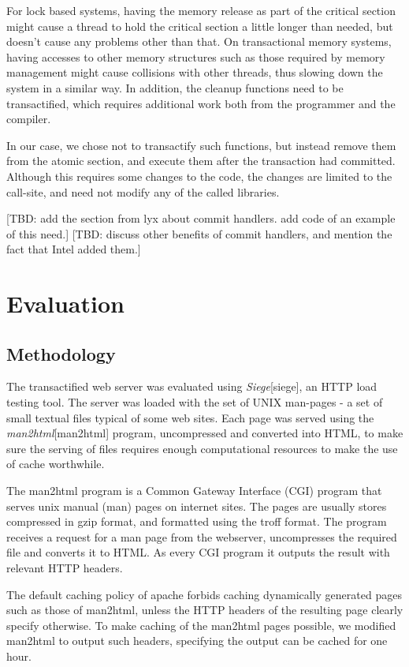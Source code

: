 \documentclass[preprint,natbib,11pt]{sigplanconf}
\begin{document}
For lock based systems, having the memory release as part of the critical section might cause a thread to hold the critical section a little longer than needed, but doesn't cause any problems other than that. On transactional memory systems, having accesses to other memory structures such as those required by memory management might cause collisions with other threads, thus slowing down the system in a similar way. In addition, the cleanup functions need to be transactified, which requires additional work both from the programmer and the compiler.

In our case, we chose not to transactify such functions, but instead remove them from the atomic section, and execute them after the transaction had committed. Although this requires some changes to the code, the changes are limited to the call-site, and need not modify any of the called libraries.

[TBD: add the section from lyx about commit handlers. add code of an example of this need.]
[TBD: discuss other benefits of commit handlers, and mention the fact that Intel added them.]
\section{Evaluation}
\subsection{Methodology}
The transactified web server was evaluated using \emph{Siege}[siege], an HTTP load testing tool. The server was loaded with the set of UNIX man-pages - a set of small textual files typical of some web sites. Each page was served using the \emph{man2html}[man2html] program, uncompressed and converted into HTML, to make sure the serving of files requires enough computational resources to make the use of cache worthwhile.

The man2html program is a Common Gateway Interface (CGI) program that serves unix manual (man) pages on internet sites. The pages are usually stores compressed in gzip format, and formatted using the troff format. The program receives a request for a man page from the webserver, uncompresses the required file and converts it to HTML. As every CGI program it outputs the result with relevant HTTP headers.

The default caching policy of apache forbids caching dynamically generated pages such as those of man2html, unless the HTTP headers of the resulting page clearly specify otherwise. To make caching of the man2html pages possible, we modified man2html to output such headers, specifying the output can be cached for one hour.
\end{document}
